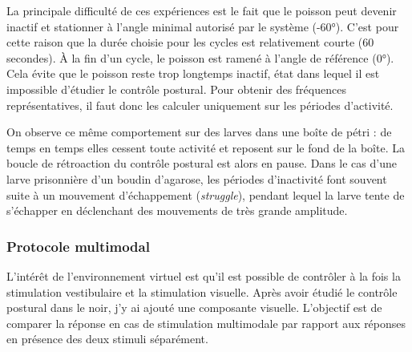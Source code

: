 La principale difficulté de ces expériences est le fait que le poisson peut devenir inactif et stationner à l'angle minimal autorisé par le système (-60°). C'est pour cette raison que la durée choisie pour les cycles est relativement courte (60 secondes). À la fin d'un cycle, le poisson est ramené à l'angle de référence (0°). Cela évite que le poisson reste trop longtemps inactif, état dans lequel il est impossible d'étudier le contrôle postural. Pour obtenir des fréquences représentatives, il faut donc les calculer uniquement sur les périodes d'activité.

On observe ce même comportement sur des larves dans une boîte de pétri : de temps en temps elles cessent toute activité et reposent sur le fond de la boîte. La boucle de rétroaction du contrôle postural est alors en pause. Dans le cas d'une larve prisonnière d'un boudin d'agarose, les périodes d'inactivité font souvent suite à un mouvement d'échappement (\emph{struggle}), pendant lequel la larve tente de s'échapper en déclenchant des mouvements de très grande amplitude.

\subsubsection{Protocole multimodal}
L'intérêt de l'environnement virtuel est qu'il est possible de contrôler à la fois la stimulation vestibulaire et la stimulation visuelle. Après avoir étudié le contrôle postural dans le noir, j'y ai ajouté une composante visuelle. L'objectif est de comparer la réponse en cas de stimulation multimodale par rapport aux réponses en présence des deux stimuli séparément.

